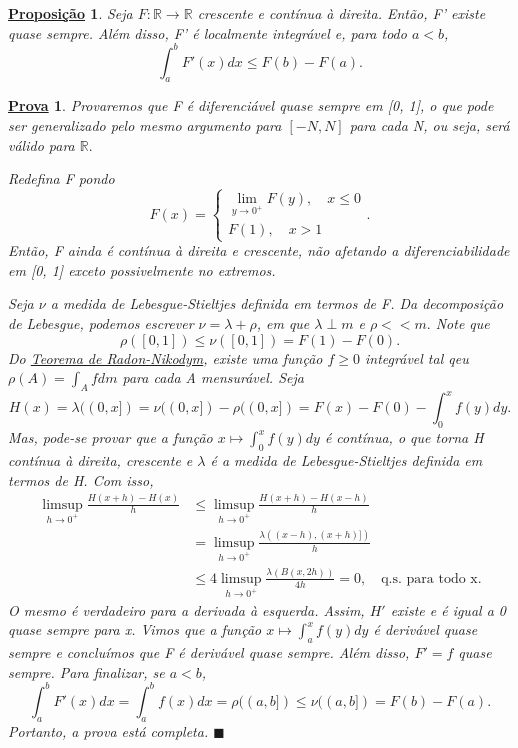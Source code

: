 \documentclass{article}
\newtheorem*{prop*}{\underline{Proposi\c c\~ao}}
\newtheorem*{proof*}{\underline{Prova}}
\renewcommand\qedsymbol{$\blacksquare$}
\begin{document}
\begin{prop*}
  Seja \(F:\mathbb{R}\rightarrow \mathbb{R}\) crescente e contínua à direita. Então, F' existe quase sempre. Além disso, F' é localmente integrável e, para todo \(a< b\), 
    \[
      \int_{a}^{b}F'(x)dx \leq F(b) - F(a).
    \]
\end{prop*}
\begin{proof*}
  Provaremos que F é diferenciável quase sempre em [0, 1], o que pode ser generalizado pelo mesmo argumento para \([-N, N]\) para cada N, ou seja, será válido para \(\mathbb{R}.\)

  Redefina F pondo 
    \[
      F(x) = \left\{\begin{array}{ll}
          \lim_{y\to 0^{+}}F(y),\quad x \leq 0\\ 
          F(1),\quad x > 1
        \end{array}\right..
    \]
  Então, F ainda é contínua à direita e crescente, não afetando a diferenciabilidade em [0, 1] exceto possivelmente no extremos. 

  Seja \(\nu \) a medida de Lebesgue-Stieltjes definida em termos de F. Da decomposição de Lebesgue, podemos escrever \(\nu = \lambda +\rho \), em que \(\lambda \perp m\) e \(\rho << m.\) Note que 
    \[
      \rho ([0, 1]) \leq \nu ([0,1]) = F(1) - F(0).
    \]
  Do \hyperlink{radon_nikodym}{\textit{Teorema de Radon-Nikodym}}, existe uma função \(f\geq 0\) integrável tal qeu \(\rho (A) = \int_{A}^{}fdm\) para cada A mensurável. Seja 
    \[
      H(x) = \lambda ((0, x]) = \nu ((0, x]) - \rho ((0, x]) = F(x) - F(0) - \int_{0}^{x}f(y)dy.
    \]
  Mas, pode-se provar que a função \(x\mapsto \int_{0}^{x}f(y)dy\) é contínua, o que torna H contínua à direita, crescente e \(\lambda \) é a medida de Lebesgue-Stieltjes definida em termos de H. Com isso, 
 \begin{align*}
   \limsup_{h\to 0^{+}}\frac{H(x+h) - H(x)}{h} &\leq \limsup_{h\to 0^{+}}\frac{H(x+h) - H(x-h)}{h}\\ 
                                               &=\limsup_{h\to 0^{+}}\frac{\lambda ((x-h), (x+h)])}{h}\\ 
                                               &\leq 4\limsup_{h\to 0^{+}}\frac{\lambda (B(x, 2h))}{4h} = 0,\quad \text{q.s. para todo x.}
 \end{align*}
 O mesmo é verdadeiro para a derivada à esquerda. Assim, \(H'\) existe e é igual a 0 quase sempre para x. Vimos que a função \(x\mapsto \int_{a}^{x}f(y)dy\) é derivável quase sempre e concluímos que F é derivável quase sempre. Além disso, \(F'=f\) quase sempre. Para finalizar, se 
 \(a < b\), 
   \[
     \int_{a}^{b}F'(x)dx = \int_{a}^{b}f(x)dx = \rho ((a, b])\leq \nu ((a, b]) = F(b) - F(a).
   \]
   Portanto, a prova está completa. \qedsymbol
\end{proof*}
\end{document}
